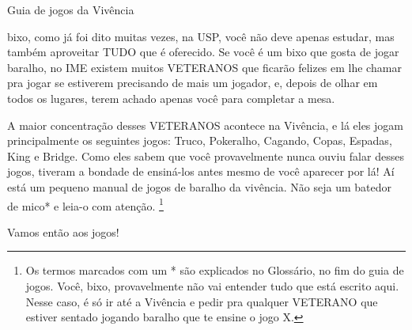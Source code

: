 \begin{secao}{Guia de jogos da Vivência }

bixo, como já foi dito muitas vezes, na USP, você não deve apenas estudar, mas
também aproveitar TUDO que é oferecido. Se você é um bixo que gosta de jogar
baralho, no IME existem muitos VETERANOS que ficarão felizes em lhe chamar pra
jogar se estiverem precisando de mais um jogador, e, depois de olhar em todos
os lugares, terem achado apenas você para completar a mesa. 

A maior concentração desses VETERANOS acontece na Vivência, e lá eles jogam
principalmente os seguintes jogos: Truco, Pokeralho, Cagando, Copas, Espadas,
King e Bridge. Como eles sabem que você provavelmente nunca ouviu falar desses jogos,
tiveram a bondade de ensiná-los antes mesmo de você aparecer por lá! Aí está um
pequeno manual de jogos de baralho da vivência. Não seja um batedor de mico* e
leia-o com atenção. \footnote{Os termos marcados com um * são explicados no Glossário, no fim do guia de
jogos. Você, bixo, provavelmente não vai entender tudo que está escrito aqui.
Nesse caso, é só ir até a Vivência e pedir pra qualquer VETERANO que estiver
sentado jogando baralho que te ensine o jogo X.}

Vamos então aos jogos!









\end{secao}
